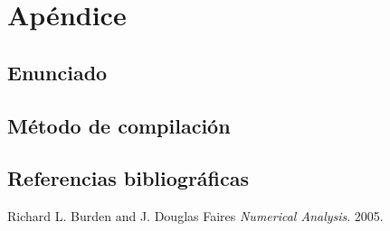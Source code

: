 \section{Ap\'endice}
\subsection{Enunciado}

\subsection{M\'etodo de compilaci\'on}


\subsection{Referencias bibliogr\'aficas}
\begin{thebibliography}{9}

  Richard L. Burden and J. Douglas Faires
  \emph{Numerical Analysis}.
  2005.
\end{thebibliography}
